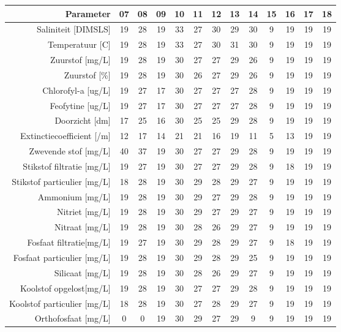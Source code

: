 \begin{tabular}{ r |c | c | c | c | c |c | c | c | c | c | c | c } 
\rowcolor[HTML]{EFEFEF}  
 Parameter & 07 & 08 & 09 & 10 & 11 & 12 & 13 & 14 & 15 & 16 & 17 & 18 \\    \hline     
Saliniteit [DIMSLS] &19 & 28 & 19 & 33 & 27 & 30 & 29 & 30 & 9 & 19 & 19 & 19 \\
Temperatuur [C] &19 & 28 & 19 & 33 & 27 & 30 & 31 & 30 & 9 & 19 & 19 & 19 \\
Zuurstof [mg/L] &19 & 28 & 19 & 30 & 27 & 27 & 29 & 26 & 9 & 19 & 19 & 19 \\
Zuurstof [\%] &19 & 28 & 19 & 30 & 26 & 27 & 29 & 26 & 9 & 19 & 19 & 19 \\
Chlorofyl-a [ug/L] &19 & 27 & 17 & 30 & 27 & 27 & 27 & 28 & 9 & 19 & 19 & 19 \\
Feofytine [ug/L] &19 & 27 & 17 & 30 & 27 & 27 & 27 & 28 & 9 & 19 & 19 & 19 \\
Doorzicht [dm] &17 & 25 & 16 & 30 & 25 & 25 & 29 & 28 & 9 & 19 & 19 & 19 \\
Extinctiecoefficient [/m] &12 & 17 & 14 & 21 & 21 & 16 & 19 & 11 & 5 & 13 & 19 & 19 \\
Zwevende stof [mg/L] &40 & 37 & 19 & 30 & 27 & 27 & 29 & 28 & 9 & 19 & 19 & 19 \\
Stikstof filtratie [mg/L] &19 & 27 & 19 & 30 & 27 & 27 & 29 & 28 & 9 & 18 & 19 & 19 \\
Stikstof particulier [mg/L] &18 & 28 & 19 & 30 & 29 & 28 & 29 & 27 & 9 & 19 & 19 & 19 \\
Ammonium [mg/L] &19 & 28 & 19 & 30 & 29 & 27 & 29 & 28 & 9 & 19 & 19 & 19 \\
Nitriet [mg/L] &19 & 28 & 19 & 30 & 29 & 27 & 29 & 27 & 9 & 19 & 19 & 19 \\
Nitraat [mg/L] &19 & 28 & 19 & 30 & 28 & 26 & 29 & 27 & 9 & 19 & 19 & 19 \\
Fosfaat filtratie[mg/L] &19 & 27 & 19 & 30 & 29 & 28 & 29 & 27 & 9 & 18 & 19 & 19 \\
Fosfaat particulier [mg/L] &19 & 28 & 19 & 30 & 29 & 28 & 29 & 25 & 9 & 19 & 19 & 19 \\
Silicaat [mg/L] &19 & 28 & 19 & 30 & 28 & 26 & 29 & 27 & 9 & 19 & 19 & 19 \\
Koolstof opgelost[mg/L] &19 & 28 & 19 & 30 & 27 & 27 & 29 & 28 & 9 & 19 & 19 & 19 \\
Koolstof particulier [mg/L] &18 & 28 & 19 & 30 & 27 & 28 & 29 & 27 & 9 & 19 & 19 & 19 \\
Orthofosfaat [mg/L] &0 & 0 & 19 & 30 & 29 & 27 & 29 & 9 & 9 & 19 & 19 & 19 \\

\end{tabular}
